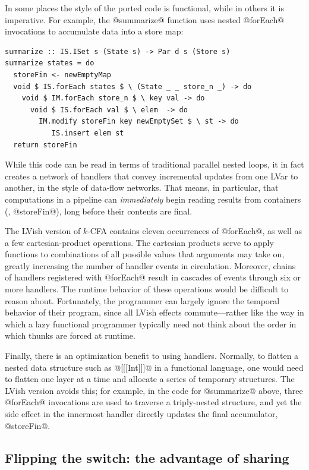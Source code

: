 In some places the style of the ported code is functional, while in
others it is imperative.  For example, the @summarize@ function uses
nested @forEach@ invocations to accumulate data into a store map:

\singlespacing
\begin{lstlisting}
summarize :: IS.ISet s (State s) -> Par d s (Store s)
summarize states = do
  storeFin <- newEmptyMap
  void $ IS.forEach states $ \ (State _ _ store_n _) -> do 
    void $ IM.forEach store_n $ \ key val -> do
      void $ IS.forEach val $ \ elem  -> do
        IM.modify storeFin key newEmptySet $ \ st -> do
           IS.insert elem st
  return storeFin
\end{lstlisting}
\doublespacing

While this code can be read in terms of traditional parallel nested
loops, it in fact creates a network of handlers that convey
incremental updates from one LVar to another, in the style of
data-flow networks.  That means, in particular, that computations in a
pipeline can \emph{immediately} begin reading results from containers
(\eg, @storeFin@), long before their contents are final.

The LVish version of $k$-CFA contains eleven occurrences of @forEach@,
as well as a few cartesian-product operations.  The cartesian products
serve to apply functions to combinations of all possible values that
arguments may take on, greatly increasing the number of handler events
in circulation.  Moreover, chains of handlers registered with
@forEach@ result in cascades of events through six or more handlers.
The runtime behavior of these operations would be difficult to reason
about.  Fortunately, the programmer can largely ignore the temporal
behavior of their program, since all LVish effects commute---rather
like the way in which a lazy functional programmer typically need not
think about the order in which thunks are forced at runtime.

Finally, there is an optimization benefit to using handlers.
Normally, to flatten a nested data structure such as @[[[Int]]]@ in a
functional language, one would need to flatten one layer at a time and
allocate a series of temporary structures.  The LVish version avoids
this; for example, in the code for @summarize@ above, three @forEach@
invocations are used to traverse a triply-nested structure, and yet
the side effect in the innermost handler directly updates the final
accumulator, @storeFin@.

\subsection{Flipping the switch: the advantage of sharing}

